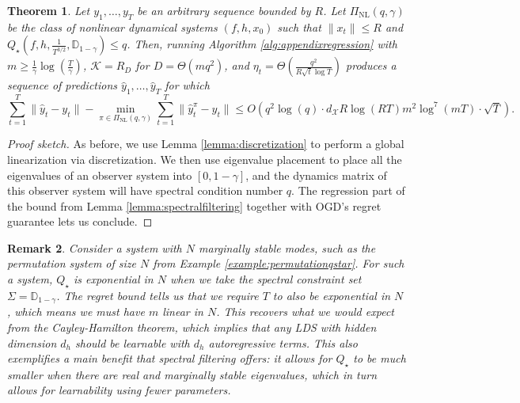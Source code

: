 \documentclass[11pt]{article}
\newtheorem{theorem}{Theorem}[section]
\newtheorem{remark}[theorem]{Remark}
\numberwithin{equation}{section}
\begin{document}
\begin{theorem}
    Let $y_1, \ldots, y_T$ be an arbitrary sequence bounded by $R$. Let $\Pi_{\mathrm{NL}}(q, \gamma)$ be the class of nonlinear dynamical systems $(f, h, x_0)$ such that $\|x_t\| \leq R$ and $Q_\star(f, h, \frac{1}{T^{3/2}}, \mathbb{D}_{1-\gamma}) \leq q$. Then, running Algorithm \ref{alg:appendixregression} with $m \geq \frac{1}{\gamma} \log\left(\frac{T}{\gamma}\right)$, $\mathcal{K} = R_D$ for $D = \Theta(mq^2)$, and $\eta_t = \Theta\left(\frac{q^2}{R\sqrt{t}\log T}\right)$ produces a sequence of predictions $\hat{y}_1, \ldots, \hat{y}_T$ for which
    $$\sum_{t=1}^T \|\hat{y}_t - y_t\| - \min_{\pi \in \Pi_{\text{NL}}(q, \gamma)} \sum_{t=1}^T \|\hat{y}_t^\pi - y_t\| \leq O\left(q^2 \log(q) \cdot d_\mathcal{X} R \log(RT) m^2 \log^7(mT)  \cdot \sqrt{T}\right)  . $$
\end{theorem}
\begin{proof}[Proof sketch]
    As before, we use Lemma \ref{lemma:discretization} to perform a global linearization via discretization. We then use eigenvalue placement to place all the eigenvalues of an observer system into $[0, 1-\gamma]$, and the dynamics matrix of this observer system will have spectral condition number $q$. The regression part of the bound from Lemma \ref{lemma:spectralfiltering} together with OGD's regret guarantee lets us conclude.
\end{proof}
\begin{remark}
\label{remark:regression}
    Consider a system with $N$ marginally stable modes, such as the permutation system of size $N$ from Example \ref{example:permutationqstar}. For such a system, $Q_\star$ is exponential in $N$ when we take the spectral constraint set $\Sigma = \mathbb{D}_{1-\gamma}$. The regret bound tells us that we require $T$ to also be exponential in $N$, which means we must have $m$ linear in $N$. This recovers what we would expect from the Cayley-Hamilton theorem, which implies that any LDS with hidden dimension $d_h$ should be learnable with $d_h$ autoregressive terms. This also exemplifies a main benefit that spectral filtering offers: it allows for $Q_\star$ to be much smaller when there are real and marginally stable eigenvalues, which in turn allows for learnability using fewer parameters.
\end{remark}
\end{document}
